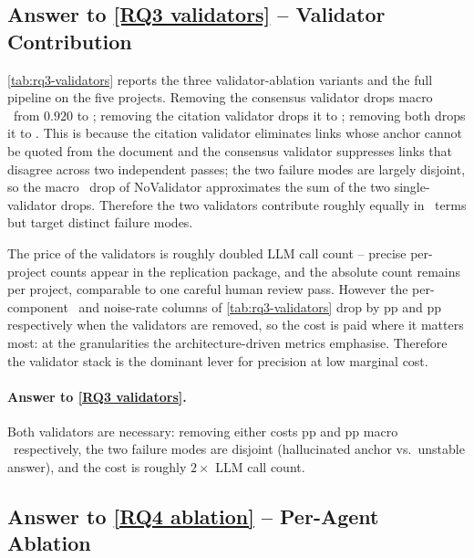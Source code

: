 \subsection{Answer to \ref{RQ3 validators} -- Validator Contribution}
\label{sec:results:rq3}

\autoref{tab:rq3-validators} reports the three validator-ablation variants and the full pipeline on the five projects.
Removing the consensus validator drops macro \fone\ from $0.920$ to ; removing the citation validator drops it to ; removing both drops it to .
This is because the citation validator eliminates links whose anchor cannot be quoted from the document and the consensus validator suppresses links that disagree across two independent passes; the two failure modes are largely disjoint, so the macro \fone\ drop of NoValidator approximates the sum of the two single-validator drops.
Therefore the two validators contribute roughly equally in \fone\ terms but target distinct failure modes.

The price of the validators is roughly doubled \ac{LLM} call count -- precise per-project counts appear in the replication package, and the absolute count remains  per project, comparable to one careful human review pass.
However the per-component \fone\ and noise-rate columns of \autoref{tab:rq3-validators} drop by pp and pp respectively when the validators are removed, so the cost is paid where it matters most: at the granularities the architecture-driven metrics emphasise.
Therefore the validator stack is the dominant lever for precision at low marginal cost.

\paragraph{Answer to \ref{RQ3 validators}.}
Both validators are necessary: removing either costs pp and pp macro \fone\ respectively, the two failure modes are disjoint (hallucinated anchor vs.\ unstable answer), and the cost is roughly $2\times$ \ac{LLM} call count.

\subsection{Answer to \ref{RQ4 ablation} -- Per-Agent Ablation}
\label{sec:results:rq4}


